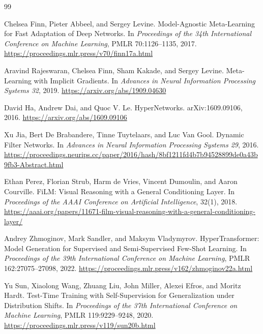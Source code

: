 \documentclass[11pt,a4paper]{article}
\begin{document}
\begin{thebibliography}{99}

Chelsea Finn, Pieter Abbeel, and Sergey Levine.
\newblock Model-Agnostic Meta-Learning for Fast Adaptation of Deep Networks.
\newblock In \emph{Proceedings of the 34th International Conference on Machine Learning}, PMLR 70:1126--1135, 2017.
\newblock \url{https://proceedings.mlr.press/v70/finn17a.html}

Aravind Rajeswaran, Chelsea Finn, Sham Kakade, and Sergey Levine.
\newblock Meta-Learning with Implicit Gradients.
\newblock In \emph{Advances in Neural Information Processing Systems 32}, 2019.
\newblock \url{https://arxiv.org/abs/1909.04630}

David Ha, Andrew Dai, and Quoc V. Le.
\newblock HyperNetworks.
\newblock arXiv:1609.09106, 2016.
\newblock \url{https://arxiv.org/abs/1609.09106}

Xu Jia, Bert De Brabandere, Tinne Tuytelaars, and Luc Van Gool.
\newblock Dynamic Filter Networks.
\newblock In \emph{Advances in Neural Information Processing Systems 29}, 2016.
\newblock \url{https://proceedings.neurips.cc/paper/2016/hash/8bf1211fd4b7b94528899de0a43b9fb3-Abstract.html}

Ethan Perez, Florian Strub, Harm de Vries, Vincent Dumoulin, and Aaron Courville.
\newblock FiLM: Visual Reasoning with a General Conditioning Layer.
\newblock In \emph{Proceedings of the AAAI Conference on Artificial Intelligence}, 32(1), 2018.
\newblock \url{https://aaai.org/papers/11671-film-visual-reasoning-with-a-general-conditioning-layer/}

Andrey Zhmoginov, Mark Sandler, and Maksym Vladymyrov.
\newblock HyperTransformer: Model Generation for Supervised and Semi-Supervised Few-Shot Learning.
\newblock In \emph{Proceedings of the 39th International Conference on Machine Learning}, PMLR 162:27075--27098, 2022.
\newblock \url{https://proceedings.mlr.press/v162/zhmoginov22a.html}

Yu Sun, Xiaolong Wang, Zhuang Liu, John Miller, Alexei Efros, and Moritz Hardt.
\newblock Test-Time Training with Self-Supervision for Generalization under Distribution Shifts.
\newblock In \emph{Proceedings of the 37th International Conference on Machine Learning}, PMLR 119:9229--9248, 2020.
\newblock \url{https://proceedings.mlr.press/v119/sun20b.html}


\end{thebibliography}
\end{document}
